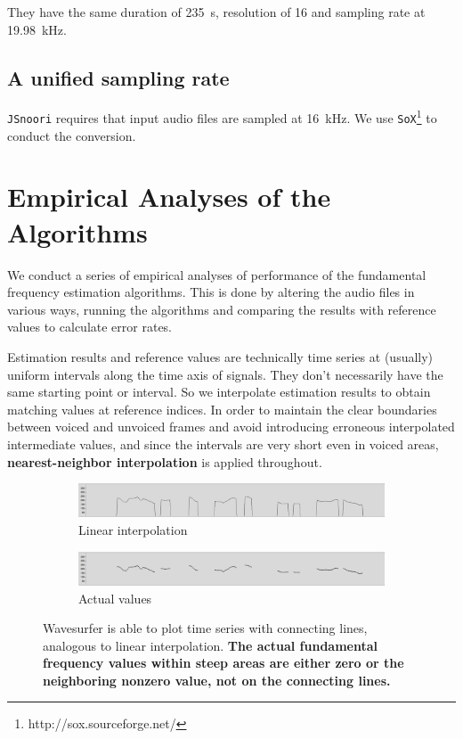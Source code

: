 \documentclass[11pt,a4paper]{report}
\begin{document}
They have the same duration of \SI{235}{\second}, resolution of \SI{16}{\bit} and sampling rate at \SI{19.98}{\kilo\hertz}.

\section{A unified sampling rate}

\texttt{JSnoori} requires that input audio files are sampled at \SI{16}{\kilo\hertz}.
We use \texttt{SoX}\footnote{http://sox.sourceforge.net/} to conduct the conversion.

\chapter{Empirical Analyses of the Algorithms} \label{emp-aly}

We conduct a series of empirical analyses of performance of the fundamental frequency estimation algorithms.
This is done by altering the audio files in various ways, running the algorithms and comparing the results with reference values to calculate error rates.

Estimation results and reference values are technically time series at (usually) uniform intervals along the time axis of signals.
They don't necessarily have the same starting point or interval.
So we interpolate estimation results to obtain matching values at reference indices.
In order to maintain the clear boundaries between voiced and unvoiced frames and avoid introducing erroneous interpolated intermediate values, and since the intervals are very short even in voiced areas, \textbf{nearest-neighbor interpolation} is applied throughout.

\begin{figure}[htbp]
  \centering
  \begin{subfigure}{\textwidth}
    \includegraphics[width=\textwidth]{f0s-lp.png}
    \caption{Linear interpolation}
    \label{fig:f0s-lp}
  \end{subfigure}

  \begin{subfigure}{\textwidth}
    \includegraphics[width=\textwidth]{f0s-real.png}
    \caption{Actual values}
    \label{fig:f0s-real}
  \end{subfigure}

  \caption[Data plotting options in Wavesurfer.]{Wavesurfer is able to plot time series with connecting lines, analogous to linear interpolation.
    \textbf{The actual fundamental frequency values within steep areas are either zero or the neighboring nonzero value, not on the connecting lines.}}
  \label{fig:f0s}
\end{figure}
\end{document}

